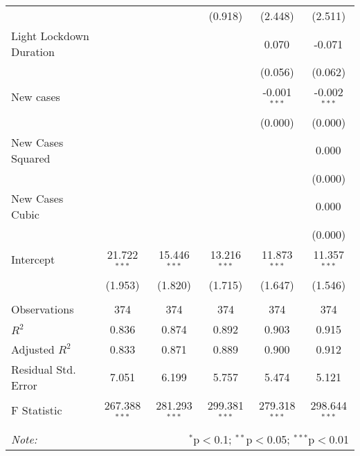 \begin{tabular}{@{\extracolsep{5pt}}lccccc}
  & & & (0.918) & (2.448) & (2.511) \\
 Light Lockdown Duration & & & & 0.070$^{}$ & -0.071$^{}$ \\
  & & & & (0.056) & (0.062) \\
 New cases & & & & -0.001$^{***}$ & -0.002$^{***}$ \\
  & & & & (0.000) & (0.000) \\
 New Cases Squared & & & & & 0.000$^{}$ \\
  & & & & & (0.000) \\
 New Cases Cubic & & & & & 0.000$^{}$ \\
  & & & & & (0.000) \\
 Intercept & 21.722$^{***}$ & 15.446$^{***}$ & 13.216$^{***}$ & 11.873$^{***}$ & 11.357$^{***}$ \\
  & (1.953) & (1.820) & (1.715) & (1.647) & (1.546) \\
\hline \\[-1.8ex]
 Observations & 374 & 374 & 374 & 374 & 374 \\
 $R^2$ & 0.836 & 0.874 & 0.892 & 0.903 & 0.915 \\
 Adjusted $R^2$ & 0.833 & 0.871 & 0.889 & 0.900 & 0.912 \\
 Residual Std. Error & 7.051 & 6.199 & 5.757 & 5.474 & 5.121  \\
 F Statistic & 267.388$^{***}$  & 281.293$^{***}$  & 299.381$^{***}$  & 279.318$^{***}$  & 298.644$^{***}$  \\
\hline
\hline \\[-1.8ex]
\textit{Note:} & \multicolumn{5}{r}{$^{*}$p$<$0.1; $^{**}$p$<$0.05; $^{***}$p$<$0.01} \\
\end{tabular}
